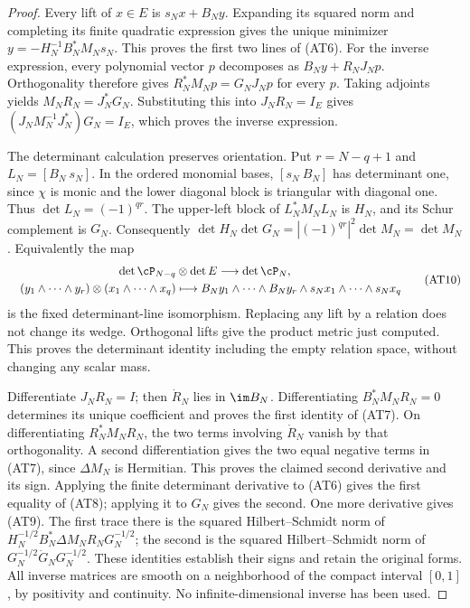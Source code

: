 \begin{proof}
Every lift of $x\in E$ is $s_Nx+B_Ny$. Expanding its squared norm
and completing its finite quadratic expression gives the unique
minimizer $y=-H_N^{-1}B_N^*M_Ns_N$. This proves the first two
lines of (AT6). For the inverse expression, every polynomial vector
$p$ decomposes as $B_Ny+R_NJ_Np$. Orthogonality therefore gives
$R_N^*M_Np=G_NJ_Np$ for every $p$. Taking adjoints yields
$M_NR_N=J_N^*G_N$. Substituting this into $J_NR_N=I_E$ gives
$(J_NM_N^{-1}J_N^*)G_N=I_E$, which proves the inverse expression.

The determinant calculation preserves orientation. Put
$r=N-q+1$ and $L_N=[B_N\ s_N]$. In the ordered monomial bases,
$[s_N\ B_N]$ has determinant one, since $\chi$ is monic and the
lower diagonal block is triangular with diagonal one. Thus
$\det L_N=(-1)^{qr}$. The upper-left block of $L_N^*M_NL_N$
is $H_N$, and its Schur complement is $G_N$. Consequently
$\det H_N\det G_N=|(-1)^{qr}|^2\det M_N=\det M_N$.
Equivalently the map
\[
 \begin{gathered}
 \det\cP_{N-q}\otimes\det E\longrightarrow\det\cP_N,\\
 \quad (y_1\wedge\cdots\wedge y_r)\otimes(x_1\wedge\cdots\wedge x_q)
 \longmapsto
 B_Ny_1\wedge\cdots\wedge B_Ny_r\wedge s_Nx_1\wedge\cdots\wedge s_Nx_q
 \end{gathered}
                                                        \tag{AT10}
\]
is the fixed determinant-line isomorphism. Replacing any lift by a
relation does not change its wedge. Orthogonal lifts give the product
metric just computed. This proves the determinant identity including
the empty relation space, without changing any scalar mass.

Differentiate $J_NR_N=I$; then $\dot R_N$ lies in $\im B_N$.
Differentiating $B_N^*M_NR_N=0$ determines its unique coefficient
and proves the first identity of (AT7). On differentiating
$R_N^*M_NR_N$, the two terms involving $\dot R_N$ vanish by
that orthogonality. A second differentiation gives the two equal
negative terms in (AT7), since $\Delta M_N$ is Hermitian. This
proves the claimed second derivative and its sign. Applying the
finite determinant derivative to (AT6) gives the first equality
of (AT8); applying it to $G_N$ gives the second.
One more derivative gives (AT9). The first trace there is the squared
Hilbert--Schmidt norm of
$H_N^{-1/2}B_N^*\Delta M_NR_NG_N^{-1/2}$; the second is the
squared Hilbert--Schmidt norm of
$G_N^{-1/2}\dot G_NG_N^{-1/2}$. These identities establish their
signs and retain the original forms. All inverse matrices are smooth
on a neighborhood of the compact interval $[0,1]$, by positivity
and continuity. No infinite-dimensional inverse has been used.
\end{proof}

